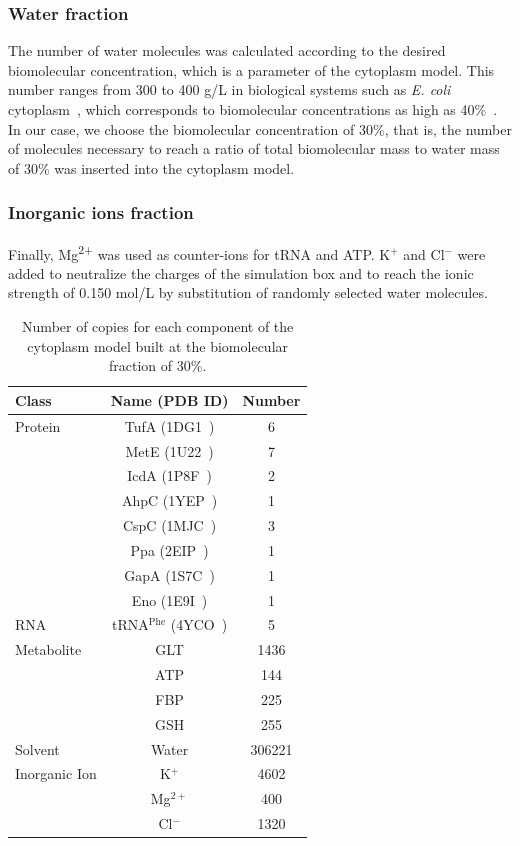 \documentclass[journal=jacsat,manuscript=article]{achemso}
\begin{document}
\subsubsection{Water fraction}
The number of water molecules was calculated according to the desired biomolecular concentration, which is a parameter of the cytoplasm model. This number ranges from 300 to 400 g/L in biological systems such as \textit{E. coli} cytoplasm~\cite{Zimmerman1991}, which corresponds to biomolecular concentrations as high as 40\%~\cite{Ellis2003a}. In our case, we choose the biomolecular concentration of 30\%, that is, the number of molecules necessary to reach a ratio of total biomolecular mass to water mass of 30\% was inserted into the cytoplasm model.

\subsubsection{Inorganic ions fraction}
Finally, Mg\textsuperscript{2+} was used as counter-ions for tRNA and ATP. K$^{+}$ and Cl$^{-}$ were added to neutralize the charges of the simulation box and to reach the ionic strength of 0.150 mol/L by substitution of randomly selected water molecules.



\begin{table}
\centering
\begin{tabular}{lcc}
\hline
Class & Name (PDB ID) & Number\\
\hline
Protein & TufA (1DG1~\cite{Abel1996}) & 6\\
  & MetE (1U22~\cite{Ferrer2004}) & 7\\
  & IcdA (1P8F~\cite{Mesecar2000}) & 2\\
  & AhpC (1YEP~\cite{Parsonage2005}) & 1\\
  & CspC (1MJC~\cite{Schindelin1994}) & 3\\
  & Ppa (2EIP~\cite{Kankare1996}) & 1\\
  & GapA (1S7C~\cite{ShinXXX}) & 1\\
  & Eno (1E9I~\cite{Kuhnel2001}) & 1\\
\hline
RNA & tRNA$^{\text{Phe}}$ (4YCO~\cite{Byrne2015}) & 5\\
\hline
Metabolite & GLT & 1436\\
  & ATP & 144\\
  & FBP & 225\\
  & GSH & 255\\
\hline
Solvent & Water & 306221\\
\hline
Inorganic Ion & K$^{+}$ & 4602\\
  & Mg$^{2+}$ & 400\\
  & Cl$^{-}$ & 1320\\
\hline
\end{tabular}
\caption{Number of copies for each component of the cytoplasm model built at the biomolecular fraction of 30\%.}
\label{tbl:soup_components}
\end{table}
\end{document}
